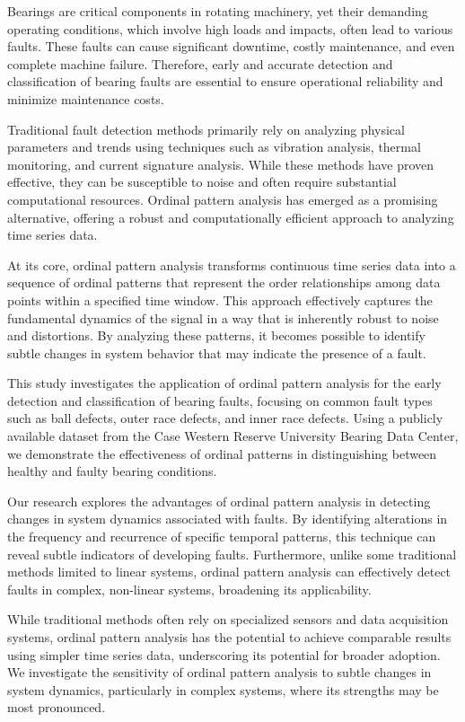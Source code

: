 \documentclass[sn-basic,pdflatex]{sn-jnl}
\theoremstyle{remark}
\theoremstyle{definition}
\begin{document}
Bearings are critical components in rotating machinery, yet their
demanding operating conditions, which involve high loads and impacts,
often lead to various faults. These faults can cause significant
downtime, costly maintenance, and even complete machine failure.
Therefore, early and accurate detection and classification of bearing
faults are essential to ensure operational reliability and minimize
maintenance costs.

Traditional fault detection methods primarily rely on analyzing physical
parameters and trends using techniques such as vibration analysis,
thermal monitoring, and current signature analysis. While these methods
have proven effective, they can be susceptible to noise and often
require substantial computational resources. Ordinal pattern analysis
has emerged as a promising alternative, offering a robust and
computationally efficient approach to analyzing time series data.

At its core, ordinal pattern analysis transforms continuous time series
data into a sequence of ordinal patterns that represent the order
relationships among data points within a specified time window. This
approach effectively captures the fundamental dynamics of the signal in
a way that is inherently robust to noise and distortions. By analyzing
these patterns, it becomes possible to identify subtle changes in system
behavior that may indicate the presence of a fault.

This study investigates the application of ordinal pattern analysis for
the early detection and classification of bearing faults, focusing on
common fault types such as ball defects, outer race defects, and inner
race defects. Using a publicly available dataset from the Case Western
Reserve University Bearing Data Center, we demonstrate the effectiveness
of ordinal patterns in distinguishing between healthy and faulty bearing
conditions.

Our research explores the advantages of ordinal pattern analysis in
detecting changes in system dynamics associated with faults. By
identifying alterations in the frequency and recurrence of specific
temporal patterns, this technique can reveal subtle indicators of
developing faults. Furthermore, unlike some traditional methods limited
to linear systems, ordinal pattern analysis can effectively detect
faults in complex, non-linear systems, broadening its applicability.

While traditional methods often rely on specialized sensors and data
acquisition systems, ordinal pattern analysis has the potential to
achieve comparable results using simpler time series data, underscoring
its potential for broader adoption. We investigate the sensitivity of
ordinal pattern analysis to subtle changes in system dynamics,
particularly in complex systems, where its strengths may be most
pronounced.
\end{document}
